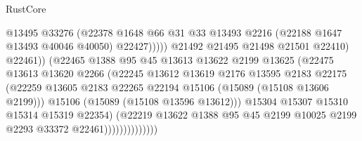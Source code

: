 \begin{lexlean}{RustCore}
\begin{coremodule}
                                          @13495
                                          @33276
                                          (@22378
                                            @1648
                                            @66
                                            @31
                                            @33
                                            @13493
                                            @2216
                                            (@22188 @1647 @13493 @40046 @40050)
                                            @22427)))))
                                  @21492
                                  @21495
                                  @21498
                                  @21501
                                  @22410)
                                @22461))
                            (@22465
                              @1388
                              @95
                              @45
                              @13613
                              @13622
                              @2199
                              @13625
                              (@22475
                                @13613
                                @13620
                                @2266
                                (@22245
                                  @13612
                                  @13619
                                  @2176
                                  @13595
                                  @2183
                                  @22175
                                  (@22259
                                    @13605
                                    @2183
                                    @22265
                                    @22194
                                    @15106
                                    (@15089 (@15108 @13606 @2199)))
                                  @15106
                                  (@15089 (@15108 @13596 @13612)))
                                @15304
                                @15307
                                @15310
                                @15314
                                @15319
                                @22354)
                              (@22219
                                @13622
                                @1388
                                @95
                                @45
                                @2199
                                @10025
                                @2199
                                @2293
                                @33372
                                @22461))))))))))))))

\end{coremodule}
\end{lexlean}
